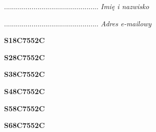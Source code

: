 \begin{turn}{90}\begin{minipage}{\linewidth} \vspace{20mm} ................................................  \textit{Imię i nazwisko}\end{minipage}\end{turn}

\begin{turn}{90}\begin{minipage}{\linewidth} \vspace{20mm} ................................................  \textit{Adres e-mailowy}\end{minipage}\end{turn}

\begin{turn}{90}\huge \begin{minipage}{\linewidth} \vspace{10mm}\textbf{S18C7552C}\end{minipage}\end{turn}

\begin{turn}{90}\huge \begin{minipage}{\linewidth} \vspace{10mm}\textbf{S28C7552C}\end{minipage}\end{turn}

\begin{turn}{90}\huge \begin{minipage}{\linewidth} \vspace{10mm}\textbf{S38C7552C}\end{minipage}\end{turn}

\begin{turn}{90}\huge \begin{minipage}{\linewidth} \vspace{10mm}\textbf{S48C7552C}\end{minipage}\end{turn}

\begin{turn}{90}\huge \begin{minipage}{\linewidth} \vspace{10mm}\textbf{S58C7552C}\end{minipage}\end{turn}

\begin{turn}{90}\huge \begin{minipage}{\linewidth} \vspace{10mm}\textbf{S68C7552C}\end{minipage}\end{turn}


